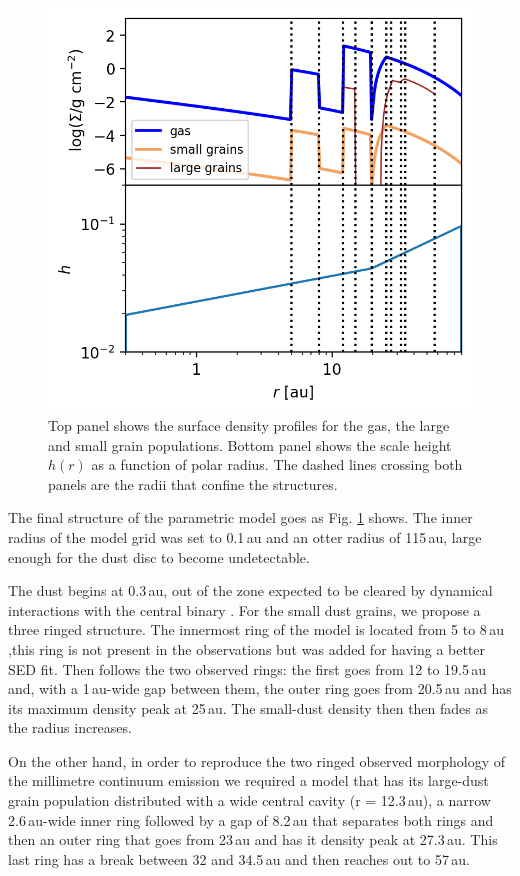 \documentclass[letters,usenatbib,times]{mnras}
\begin{document}
\begin{figure}
	\includegraphics[width=\columnwidth]{allprofiles.png}
    \caption{Top panel shows the surface density profiles for the gas, the large and small grain populations. Bottom panel shows the scale height $h(r)$ as a function of polar radius. The dashed lines crossing both panels are the radii that confine the structures.}
    \label{fig:profiles}
\end{figure}

The final structure of the parametric model goes as Fig. \ref{fig:profiles} shows. The inner radius of the model grid was set to 0.1\,au and an otter radius of 115\,au, large enough for the dust disc to become undetectable.

The dust begins at 0.3\,au, out of the zone expected to be cleared by dynamical interactions with the central binary \citep{Art_Lu}. For the small dust grains, we propose a three ringed structure. The innermost ring of the model is located from 5 to 8\,au ,this ring is not present in the observations but was added for having a better SED fit. Then follows the two observed rings: the first goes from 12 to 19.5\,au and, with a 1\,au-wide gap between them, the outer ring goes from 20.5\,au and has its maximum density peak at 25\,au. The small-dust density then then fades as the radius increases.

On the other hand, in order to reproduce the two ringed observed morphology of the millimetre continuum emission we required a model that has its large-dust grain population distributed with a wide central cavity (r = 12.3\,au), a narrow 2.6\,au-wide inner ring followed by a gap of 8.2\,au that separates both rings and then an outer ring that goes from 23\,au and has it density peak at 27.3\,au. This last ring has a break between 32 and 34.5\,au and then reaches out to 57\,au.
\end{document}
